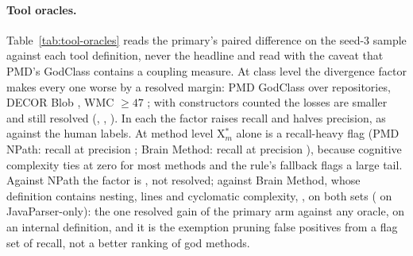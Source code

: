 \documentclass[11pt,a4paper]{article}
\newcommand{\madz}{modified $z \geq 3.5$}
\newcommand{\fitwidth}[1]{\resizebox{\ifdim\width>\textwidth\textwidth\else\width\fi}{!}{#1}}
\newcommand{\Xm}{X$^*_m$}
\begin{document}
\begin{table}[t]
\centering
\caption{Method level against MLCQ human Long Method on the confirm half,
\methUniv{} reviewed methods in \methRepos{} repositories: \Xm{} alone and
its forms under flow on all calls, by \madz{}.}
\label{tab:method}
\small
\setlength{\tabcolsep}{4pt}
\fitwidth{}
\end{table}

\paragraph{Tool oracles.}
\label{sec:tools}
Table~\ref{tab:tool-oracles} reads the primary's paired difference on the
seed-3 sample against each tool definition, never the headline and read with
the caveat that PMD's GodClass contains a coupling measure. At class level
the divergence factor makes every one worse by a resolved margin: PMD
GodClass \toolPmdMicro{} over \toolPmdN{} repositories, DECOR Blob
\toolDecorMicro{}, WMC $\geq 47$ \toolWmcMicro{}; with constructors counted
the losses are smaller and still resolved (\toolPmdCtorMicro{},
\toolDecorCtorMicro{}, \toolWmcCtorMicro{}). In each the factor raises
recall and halves precision, as against the human labels. At method level
\Xm{} alone is a recall-heavy flag (PMD NPath: recall \toolNpathXRecall{}
at precision \toolNpathXPrecision{}; Brain Method: recall
\toolBrainXRecall{} at precision \toolBrainXPrecision{}), because cognitive
complexity ties at zero for most methods and the rule's fallback flags a
large tail. Against NPath the factor is \toolNpathMicro{}, not resolved;
against Brain Method, whose definition contains nesting, lines and
cyclomatic complexity, \toolBrainMicro{}, \toolBrainReading{} on both sets
(\toolBrainJpMicro{} on JavaParser-only): the one resolved gain of the
primary arm against any oracle, on an internal definition, and it is the exemption
pruning false positives from a flag set of \toolBrainXRecall{} recall, not a
better ranking of god methods.

\begin{table}[t]
\centering
\caption{The primary form against the tool and internal definitions on the
seed-3 sample, by \madz{}, pooled over the repositories carrying each
definition. Positives are the definition's own flags. PMD GodClass contains
a coupling measure (ATFD), so agreement with it is partly circular.}
\label{tab:tool-oracles}
\small
\setlength{\tabcolsep}{4pt}
\fitwidth{}
\end{table}
\end{document}
